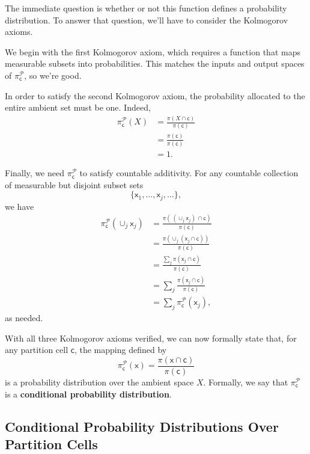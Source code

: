 \documentclass[
  letterpaper,
  DIV=11,
  numbers=noendperiod]{scrartcl}
\begin{document}
The immediate question is whether or not this function defines a
probability distribution. To answer that question, we'll have to
consider the Kolmogorov axioms.

We begin with the first Kolmogorov axiom, which requires a function that
maps measurable subsets into probabilities. This matches the inputs and
output spaces of \(\pi^{\mathcal{P}}_{\mathsf{c}}\), so we're good.

In order to satisfy the second Kolmogorov axiom, the probability
allocated to the entire ambient set must be one. Indeed, \begin{align*}
\pi^{\mathcal{P}}_{\mathsf{c}}( X )
&=
\frac{ \pi(X \cap \mathsf{c}) }{ \pi(\mathsf{c}) }
\\
&=
\frac{ \pi(\mathsf{c}) }{ \pi(\mathsf{c}) }
\\
&=
1.
\end{align*}

Finally, we need \(\pi^{\mathcal{P}}_{\mathsf{c}}\) to satisfy countable
additivity. For any countable collection of measurable but disjoint
subset sets \[
\{ \mathsf{x}_{1}, \ldots, \mathsf{x}_{j}, \ldots \},
\] we have \begin{align*}
\pi^{\mathcal{P}}_{\mathsf{c}}( \cup_{j} \mathsf{x}_{j} )
&=
\frac{ \pi( \, (\cup_{j} \mathsf{x}_{j}) \, \cap \mathsf{c}) }
{ \pi(\mathsf{c}) }
\\
&=
\frac{ \pi( \cup_{j} (\mathsf{x}_{j} \cap \mathsf{c}) ) }
{ \pi(\mathsf{c}) }
\\
&=
\frac{ \sum_{j} \pi( \mathsf{x}_{j} \cap \mathsf{c} ) }
{ \pi(\mathsf{c}) }
\\
&=
\sum_{j} \frac{ \pi( \mathsf{x}_{j} \cap \mathsf{c} ) }
{ \pi(\mathsf{c}) }
\\
&=
\sum_{j} \pi^{\mathcal{P}}_{\mathsf{c}}( \mathsf{x}_{j} ),
\end{align*} as needed.

With all three Kolmogorov axioms verified, we can now formally state
that, for any partition cell \(\mathsf{c}\), the mapping defined by \[
\pi^{\mathcal{P}}_{\mathsf{c}}( \mathsf{x} )
=
\frac{ \pi( \mathsf{x} \cap \mathsf{c}) }{ \pi (\mathsf{c}) }
\] is a probability distribution over the ambient space \(X\). Formally,
we say that \(\pi^{\mathcal{P}}_{\mathsf{c}}\) is a \textbf{conditional
probability distribution}.

\subsection{Conditional Probability Distributions Over Partition
Cells}\label{conditional-probability-distributions-over-partition-cells}
\end{document}
